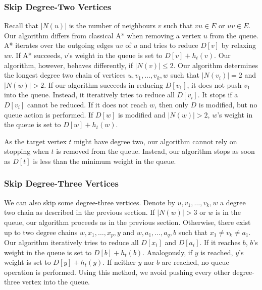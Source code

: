 \documentclass[manuscript]{acmart}
\begin{document}

\subsubsection{Skip Degree-Two Vertices}\label{sec:deg2}

Recall that $|N(u)|$ is the number of neighbours $v$ such that $vu \in E$ or $uv \in E$.
Our algorithm differs from classical A* when removing a vertex $u$ from the queue.
A* iterates over the outgoing edges $uv$ of $u$ and tries to reduce $D[v]$ by relaxing $uv$.
If A* succeeds, $v$'s weight in the queue is set to $D[v]+h_t(v)$.
Our algorithm, however, behaves differently, if $|N(v)|\le 2$.
Our algorithm determines the longest degree two chain of vertices $u, v_1,\ldots, v_k, w$ such that $|N(v_i)|=2$ and $|N(w)| > 2$.
If our algorithm succeeds in reducing $D[v_1]$, it does not push $v_1$ into the queue.
Instead, it iteratively tries to reduce all $D[v_i]$.
It stops if a $D[v_i]$ cannot be reduced.
If it does not reach $w$, then only $D$ is modified, but no queue action is performed.
If $D[w]$ is modified and $|N(w)|>2$, $w$'s weight in the queue is set to $D[w]+h_t(w)$.

As the target vertex $t$ might have degree two, our algorithm cannot rely on stopping when $t$ is removed from the queue.
Instead, our algorithm stops as soon as $D[t]$ is less than the minimum weight in the queue.

\subsubsection{Skip Degree-Three Vertices}\label{sec:deg3}

We can also skip some degree-three vertices.
Denote by $u, v_1,\ldots, v_k, w$ a degree two chain as described in the previous section.
If $|N(w)| > 3$ or $w$ is in the queue, our algorithm proceeds as in the previous section.
Otherwise, there exist up to two degree chains $w, x_1,\ldots,x_p, y$ and $w,a_1,\ldots,a_q,b$ such that $x_1\neq v_k \neq a_1$.
Our algorithm iteratively tries to reduce all $D[x_i]$ and $D[a_i]$.
If it reaches $b$, $b$'s weight in the queue is set to $D[b]+h_t(b)$.
Analogously, if $y$ is reached, $y$'s weight is set to $D[y]+h_t(y)$.
If neither $y$ nor $b$ are reached, no queue operation is performed.
Using this method, we avoid pushing every other degree-three vertex into the queue.
\end{document}
